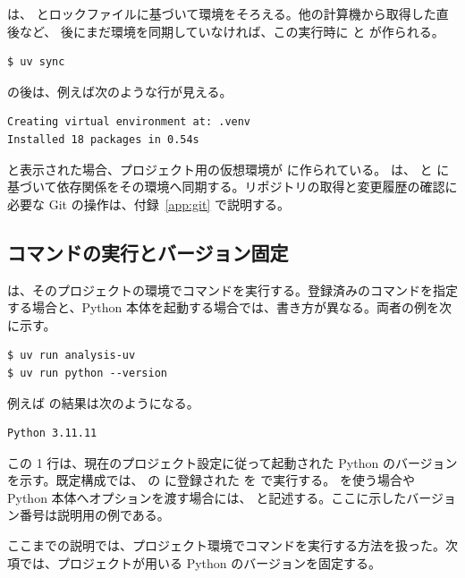  は、 とロックファイルに基づいて環境をそろえる。他の計算機から取得した直後など、 後にまだ環境を同期していなければ、この実行時に  と  が作られる。

\begin{lstlisting}[numbers=none, xleftmargin=2\zw]
$ uv sync
\end{lstlisting}

 の後は、例えば次のような行が見える。

\begin{lstlisting}[numbers=none, xleftmargin=2\zw]
Creating virtual environment at: .venv
Installed 18 packages in 0.54s
\end{lstlisting}

 と表示された場合、プロジェクト用の仮想環境が  に作られている。 は、 と  に基づいて依存関係をその環境へ同期する。リポジトリの取得と変更履歴の確認に必要な Git の操作は、付録~\ref{app:git} で説明する。

\subsection{コマンドの実行とバージョン固定}

 は、そのプロジェクトの環境でコマンドを実行する。登録済みのコマンドを指定する場合と、Python 本体を起動する場合では、書き方が異なる。両者の例を次に示す。

\begin{lstlisting}[numbers=none, xleftmargin=2\zw]
$ uv run analysis-uv
$ uv run python --version
\end{lstlisting}

例えば  の結果は次のようになる。

\begin{lstlisting}[numbers=none, xleftmargin=2\zw]
Python 3.11.11
\end{lstlisting}

この 1 行は、現在のプロジェクト設定に従って起動された Python のバージョンを示す。既定構成では、 の  に登録された  を  で実行する。 を使う場合や Python 本体へオプションを渡す場合には、 と記述する。ここに示したバージョン番号は説明用の例である。

ここまでの説明では、プロジェクト環境でコマンドを実行する方法を扱った。次項では、プロジェクトが用いる Python のバージョンを固定する。

